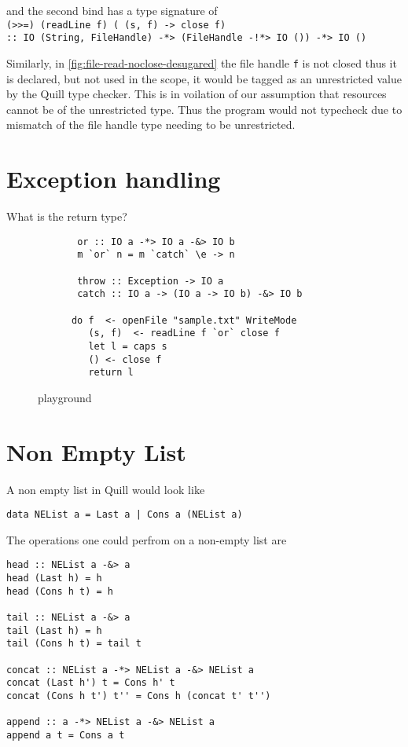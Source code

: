 and the second bind has a type signature of\\
\texttt{(>>=) (readLine f) (\ (s, f) -> close f)}\\
\texttt{:: IO (String, FileHandle) -*> (FileHandle -!*> IO ()) -*> IO ()}

Similarly, in \cref{fig:file-read-noclose-desugared} the file handle \texttt{f} is not closed thus it is declared, but not used
in the scope, it would be tagged as an unrestricted value by the Quill type checker.
This is in voilation of our assumption that resources cannot be of the unrestricted type. Thus
the program would not typecheck due to mismatch of the file handle type needing to be unrestricted.


\section{Exception handling}

What is the return type?
\begin{figure}[h]
  \begin{framed}
    \begin{verbatim}
       or :: IO a -*> IO a -&> IO b
       m `or` n = m `catch` \e -> n

       throw :: Exception -> IO a
       catch :: IO a -> (IO a -> IO b) -&> IO b

      do f  <- openFile "sample.txt" WriteMode
         (s, f)  <- readLine f `or` close f
         let l = caps s
         () <- close f
         return l

    \end{verbatim}
  \end{framed}
  \caption{playground}
  \label{fig:playground}
\end{figure}



\section{Non Empty List}\label{sec:dll-example}
A non empty list in Quill would look like
\begin{verbatim}
data NEList a = Last a | Cons a (NEList a)
\end{verbatim}

The operations one could perfrom on a non-empty list are
\begin{verbatim}
head :: NEList a -&> a
head (Last h) = h
head (Cons h t) = h

tail :: NEList a -&> a
tail (Last h) = h
tail (Cons h t) = tail t

concat :: NEList a -*> NEList a -&> NEList a
concat (Last h') t = Cons h' t
concat (Cons h t') t'' = Cons h (concat t' t'')

append :: a -*> NEList a -&> NEList a
append a t = Cons a t
\end{verbatim}

